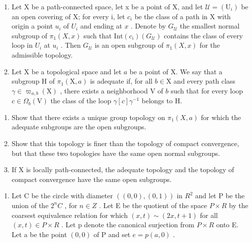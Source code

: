 \exercisegroup

\begin{enumerate}
\def\labelenumi{\arabic{enumi})}
\item
  Let X be a path-connected space, let x be a point of X, and let \(\mathcal{U} = (\mathrm{U}_{i})\) be an open covering of X; for every i, let \(c_{i}\) be the class of a path in X with origin a point \(u_i\) of \(U_i\) and ending at \(x\) . Denote by \(G_{\mathcal{U}}\) the smallest normal subgroup of \(\pi_1(X,x)\) such that \(\text{Int}(c_i)(G_{\mathcal{U}})\) contains the class of every loop in \(U_i\) at \(u_i\) . Then \(G_{\mathcal{U}}\) is an open subgroup of \(\pi_1(X,x)\) for the admissible topology.
\item
  Let X be a topological space and let \(a\) be a point of X. We say that a subgroup H of \(\pi_1(\mathrm{X}, a)\) is adequate if, for all \(b \in \mathrm{X}\) and every path class \(\gamma \in \varpi_{a,b}(\mathrm{X})\) , there exists a neighborhood V of \(b\) such that for every loop \(c \in \Omega_b(\mathrm{V})\) the class of the loop \(\gamma[c]\gamma^{-1}\) belongs to H.
\end{enumerate}

\begin{enumerate}
\def\labelenumi{\alph{enumi})}
\item
  Show that there exists a unique group topology on \(\pi_{1}(X,a)\) for which the adequate subgroups are the open subgroups.
\item
  Show that this topology is finer than the topology of compact convergence, but that these two topologies have the same open normal subgroups.
\item
  If X is locally path-connected, the adequate topology and the topology of compact convergence have the same open subgroups.
\end{enumerate}

\begin{enumerate}
\def\labelenumi{\arabic{enumi})}
\setcounter{enumi}{2}
\tightlist
\item
  Let C be the circle with diameter \(((0,0),(0,1))\) in \(R^{2}\) and let P be the union of the \(2^{n}C\) , for \(n \in Z\) . Let E be the quotient of the space \(P \times R\) by the coarsest equivalence relation for which \((x,t) \sim (2x,t+1)\) for all \((x,t) \in P \times R\) . Let p denote the canonical surjection from \(P \times R\) onto E. Let a be the point \((0,0)\) of P and set \(e = p(a,0)\) .
\end{enumerate}

